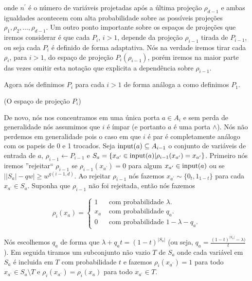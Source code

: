 onde $n^{\prime}$ é o número de variáveis projetadas após a última projeção $\rho_{d - 1}$ e ambas igualdades acontecem com alta probabilidade sobre as possíveis projeções $\rho_{1}, \rho_{2}, \dots, \rho_{d - 1}$. Um outro ponto importante sobre os espaços de projeções que iremos considerar é que cada $P_{i}$, $i > 1$, depende da projeção $\rho_{i - 1}$ tirada de $P_{i - 1}$, ou seja cada $P_{i}$ é definido de forma adaptativa. Nós na verdade iremos tirar cada $\rho_{i}$, para $i > 1$, do espaço de projeção $P_{i}(\rho_{i - 1})$, porém iremos na maior parte das vezes omitir esta notação que explicita a dependência sobre $\rho_{i - 1}$.

Agora nós definimos $P_{i}$ para cada $i > 1$ de forma análoga a como definimos $P_{1}$.

\begin{defi} (O espaço de projeção $P_{i}$) \label{defi_Pi}

De novo, nós nos concentramos em uma única porta $a \in A_{i}$ e sem perda de generalidade nós assumimos que $i$ é ímpar (e portanto $a$ é uma porta $\land$). Nós não perdemos em generalidade pois o caso em que $i$ é par é completamente análogo com os papeis de 0 e 1 trocados. Seja $\text{input}(a) \subseteq A_{i - 1}$ o conjunto de variáveis de entrada de $a$, $\rho_{i - 1} \leftarrow P_{i - 1}$ e $S_{a} = \{x_{a^{\prime}} \in \text{input}(a) \lvert \rho_{i - 1}(x_{a^{\prime}}) = x_{a^{\prime}}\}$. Primeiro nós iremos ''rejeitar`` $\rho_{i - 1}$ se $\rho_{i - 1}(x_{a^{\prime}}) = 0$ para algum $x_{a^{\prime}} \in \text{input}(a)$ ou se $\big\lvert \lvert S_{a} \rvert - qw \big\rvert \geq w^{g(i - 1, d)}$. Ao rejeitar $\rho_{i - 1}$ nós fazemos $x_{a^{\prime}} \sim \{0_{t}, 1_{1 - t}\}$ para cada $x_{a^{\prime}} \in S_{a}$. Suponha que $\rho_{i - 1}$ não foi rejeitada, então nós fazemos

\begin{equation*}
	\rho_{i}(x_{a}) = \begin{cases}
			        	  1 & \text{ com probabilidade } \lambda. \\
			        	  x_{a} & \text{ com probabilidade } q_{a}. \\
			        	  0 & \text{ com probabilidade } 1 - \lambda - q_{a}.
			        \end{cases}
\end{equation*}

Nós escolhemos $q_{a}$ de forma que $\lambda + q_{a}t = (1 -t)^{\lvert S_{a} \rvert}$ (ou seja, $q_{a} = \frac{(1 - t)^{\lvert S_{a} \rvert} - \lambda)}{t}$). Em seguida tiramos um subconjunto não vazio $T$ de $S_{a}$ onde cada variável em $S_{a}$ é incluida em $T$ com probabilidade $t$ e fazemos $\rho_{i}(x_{a^{\prime}}) = 1$ para todo $x_{a^{\prime}} \in S_{a} \setminus T$ e $\rho_{i}(x_{a^{\prime}}) = \rho_{i}(x_{a})$ para todo $x_{a^{\prime}} \in T$.

\end{defi}

